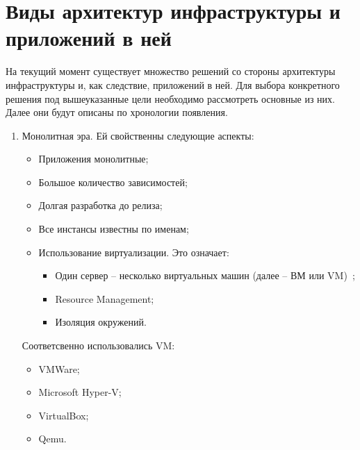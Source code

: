 \section{Виды архитектур инфраструктуры и приложений в ней}
\label{sec:history}

На текущий момент существует множество решений со стороны архитектуры инфраструктуры и, как следствие, приложений в ней. Для выбора конкретного решения под вышеуказанные цели необходимо рассмотреть основные из них. Далее они будут описаны по хронологии появления.

\begin{enumerate}
    \item Монолитная эра. Ей свойственны следующие аспекты:
        \begin{itemize}
            \item Приложения монолитные;
            \item Большое количество зависимостей;
            \item Долгая разработка до релиза;
            \item Все инстансы известны по именам;
            \item Использование виртуализации. Это означает:
                \begin{itemize}
                    \item Один сервер -- несколько виртуальных машин (далее -- ВМ или VM)~\cite{wiki:vm};
                    \item Resource Management;
                    \item Изоляция окружений.
                \end{itemize}
        \end{itemize}

        Соответсвенно использовались VM:
        \begin{itemize}
            \item VMWare;
            \item Microsoft Hyper-V;
            \item VirtualBox;
            \item Qemu.
        \end{itemize}


\end{enumerate}
